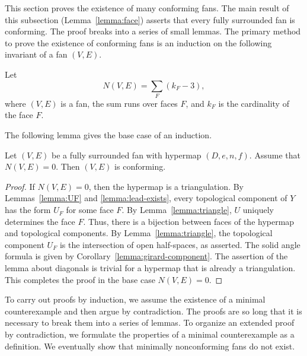 This section proves the existence of many conforming fans.  The main result
of this subsection
(Lemma~\ref{lemma:face}) asserts that every fully surrounded fan is conforming.  The
proof breaks into a series of small lemmas.  The primary
method to prove the existence of conforming fans is an induction on
the following invariant of a fan $(V,E)$.

\begin{definition}[$N(V,E)$]
Let
\[ 
N(V,E) = \sum_F (k_F - 3),
\] 
where $(V,E)$ is a fan, the sum runs over faces $F$, and $k_F$ is the
cardinality of the face $F$.
\end{definition}

The following lemma gives the base case of an induction.

\begin{lemma}[]\cutrate{}\label{lemma:N=0}
Let $(V,E)$ be a fully surrounded fan with hypermap $(D,e,n,f)$. 
Assume that $N(V,E)=0$.
Then $(V,E)$ is conforming.
\end{lemma}
%
%
%

\begin{proof}
If $N(V,E)=0$, then the hypermap is a triangulation.  By
Lemmas~\ref{lemma:UF} and \ref{lemma:lead-exists}, every topological
component of $Y$ has the form $U_F$ for some face $F$.  By
Lemma~\ref{lemma:triangle}, $U$ uniquely determines the face $F$.
Thus, there is a bijection between faces of the hypermap and
topological components.  By Lemma~\ref{lemma:triangle}, the
topological component $U_F$ is the intersection of open half-spaces,
as asserted.  The solid angle formula is given by
Corollary~\ref{lemma:girard-component}.  The assertion of the lemma
about diagonals
is trivial for a hypermap that is already a triangulation. This
completes the proof in the base case $N(V,E)=0$.
\end{proof}

To carry out proofs by induction, we assume the existence of a minimal
counterexample and then argue by contradiction.  The proofs are so
long that it is necessary to break them into a series of lemmas.  To
organize an extended proof by contradiction, we formulate the
properties of a minimal counterexample as a definition.  We eventually
show that minimally nonconforming fans do not exist.

